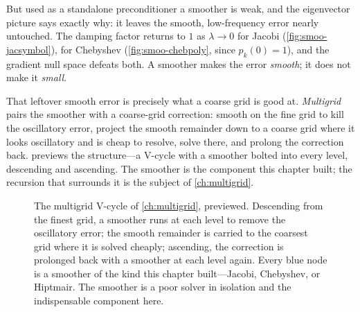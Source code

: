 But used as a standalone preconditioner a smoother is weak, and the eigenvector
picture says exactly why: it leaves the smooth, low-frequency error nearly
untouched. The damping factor returns to $1$ as $\lambda\to0$ for Jacobi
(\cref{fig:smoo-jacsymbol}), for Chebyshev (\cref{fig:smoo-chebpoly}, since
$p_k(0)=1$), and the gradient null space defeats both. A smoother makes the error
\emph{smooth}; it does not make it \emph{small}.

That leftover smooth error is precisely what a coarse grid is good at. \emph{Multigrid}
pairs the smoother with a coarse-grid correction: smooth on the fine grid to kill the
oscillatory error, project the smooth remainder down to a coarse grid where it looks
oscillatory and is cheap to resolve, solve there, and prolong the correction back.
 previews the structure---a V-cycle with a smoother bolted into
every level, descending and ascending. The smoother is the component this chapter
built; the recursion that surrounds it is the subject of \cref{ch:multigrid}.

\begin{figure}[t]
\centering
{}
\caption[Smoothers inside a multigrid V-cycle (preview)]{The multigrid V-cycle of
\cref{ch:multigrid}, previewed. Descending from the finest grid, a smoother runs at
each level to remove the oscillatory error; the smooth remainder is carried to the
coarsest grid where it is solved cheaply; ascending, the correction is prolonged
back with a smoother at each level again. Every blue node is a smoother of the kind
this chapter built---Jacobi, Chebyshev, or Hiptmair. The smoother is a poor solver
in isolation and the indispensable component here.}
\label{fig:smoo-vcycle}
\end{figure}

